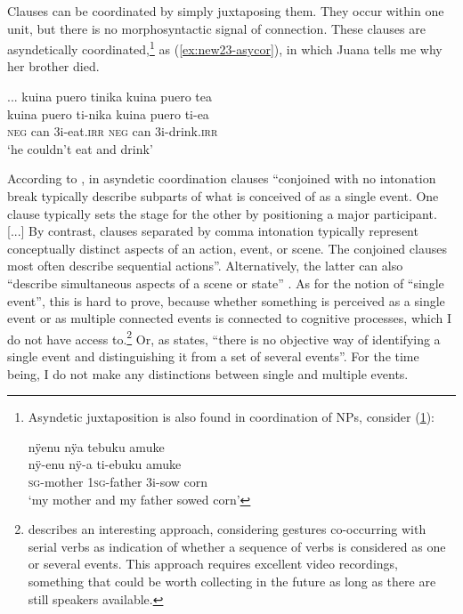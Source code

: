 Clauses can be coordinated by simply juxtaposing them. They occur within one  unit, but there is no morphosyntactic signal of connection. These clauses are asyndetically coordinated,\footnote{Asyndetic juxtaposition is also found in coordination of NPs, consider (\ref{ex:motherfather}):

\ea\label{ex:motherfather}
\begingl
\glpreamble nÿenu nÿa tebuku amuke\\
\gla nÿ-enu nÿ-a ti-ebuku amuke\\
\textsc{sg}-mother 1\textsc{sg}-father 3i-sow corn\\
\glft ‘my mother and my father sowed corn’
\endgl
\trailingcitation{[rxx-p181101l-2.200]}
\xe}
as (\ref{ex:new23-asycor}), in which Juana tells me why her brother died.

\ea\label{ex:new23-asycor}
\begingl
\glpreamble ... kuina puero tinika kuina puero tea\\
\gla kuina puero ti-nika kuina puero ti-ea\\
\glb \textsc{neg} can 3i-eat.\textsc{irr} \textsc{neg} can 3i-drink.\textsc{irr}\\
\glft ‘he couldn’t eat and drink’
\endgl
\trailingcitation{[jxx-p120430l-2.370]}
\xe

According to \citet[335]{Mithun1988}, in asyndetic coordination clauses “conjoined with no intonation break typically describe subparts of what is conceived of as a single event. One clause typically sets the stage for the other by positioning a major participant. [...] By contrast, clauses separated by comma intonation typically represent conceptually distinct aspects of an action, event, or scene. The conjoined clauses most often describe sequential actions”. Alternatively, the latter can also “describe simultaneous aspects of a scene or state” \citep[336]{Mithun1988}. As for the notion of “single event”, this is hard to prove, because whether something is perceived as a single event or as multiple connected events is connected to cognitive processes, which I do not have access to.\footnote{\citet[]{Defina2016} describes an interesting approach, considering gestures co-occurring with serial verbs as indication of whether a sequence of verbs is considered as one or several events. This approach requires excellent video recordings, something that could be worth collecting in the future as long as there are still speakers available.} Or, as \citet[306]{Haspelmath2016} states, “there is no objective way of identifying a single event and distinguishing it from a set of several events”. For the time being, I do not make any distinctions between single and multiple events.

